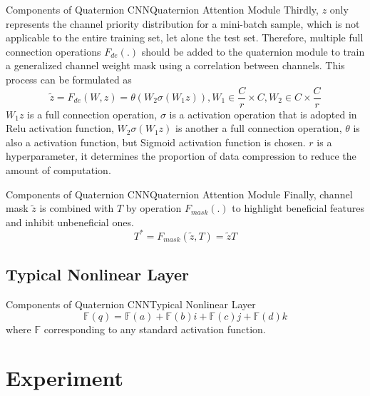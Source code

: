 \documentclass{beamer}
\begin{document}
\begin{frame}{Components of Quaternion CNN}{Quaternion Attention Module}
Thirdly, $z$ only represents the channel priority distribution
for a mini-batch sample, which is not applicable to the entire
training set, let alone the test set. Therefore, multiple full connection operations $F_{de}(.)$ should be added to the quaternion
module to train a generalized channel weight mask using a
correlation between channels. This
process can be formulated as 
\begin{equation}
    \widetilde{z} =F_{de}(W,z)=\theta(W_2\sigma(W_1z)), W_1\in \frac{C}{r}\times C, W_2\in C\times \frac{C}{r}
\end{equation}
$W_1z$ is a full connection operation, $\sigma$ is a activation operation that is adopted in Relu activation function, $W_2\sigma(W_1z)$ is
another a full connection operation, $\theta$ is also a activation function, but Sigmoid activation function is chosen. $r$ is a hyperparameter, it determines the proportion of data compression
to reduce the amount of computation. 
\end{frame}

\begin{frame}{Components of Quaternion CNN}{Quaternion Attention Module}
Finally, channel mask $\widetilde{z}$
    is combined with $T$ by operation $F_{mask}(.)$ to highlight beneficial features and inhibit unbeneficial ones. 
    \begin{equation}
        T^*=F_{mask}(\widetilde{z},T)=\widetilde{z}T
    \end{equation}
\end{frame}


\subsection{Typical Nonlinear Layer}
\begin{frame}{Components of Quaternion CNN}{Typical Nonlinear Layer}
\begin{equation}
    \mathbb{F}  (q) = \mathbb{F} (a) + \mathbb{F} (b) i + \mathbb{F} (c) j + \mathbb{F} (d) k
\end{equation}
where $\mathbb{F}$ corresponding to any standard activation function.
\end{frame}

\section{Experiment}
\end{document}
